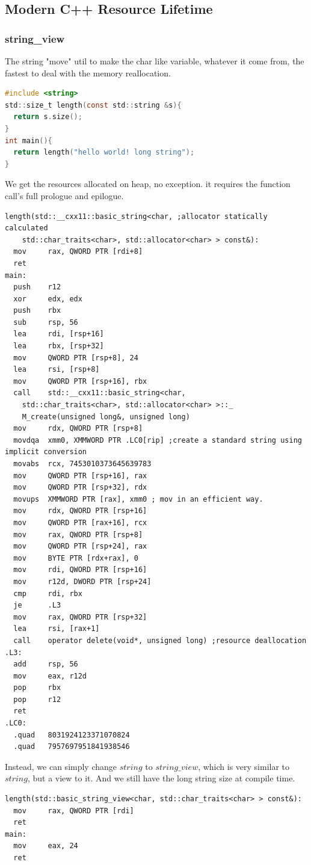 \documentclass[a4paper]{article}
\theoremstyle{definition}
\begin{document}
\subsection{Modern C++ Resource Lifetime}
\subsubsection{string\_view}
The string "move" util to make the char like variable, whatever it come from, the fastest to deal with the memory reallocation.

\begin{lstlisting}[language=C]
#include <string>
std::size_t length(const std::string &s){
  return s.size();
}
int main(){
  return length("hello world! long string");
}
\end{lstlisting}

We get the resources allocated on heap, no exception. it requires the function call's full prologue and epilogue.
\begin{lstlisting}[language={[Motorola68k]Assembler}]
  length(std::__cxx11::basic_string<char, ;allocator statically calculated
    std::char_traits<char>, std::allocator<char> > const&):
  mov     rax, QWORD PTR [rdi+8]
  ret
main:
  push    r12
  xor     edx, edx
  push    rbx
  sub     rsp, 56
  lea     rdi, [rsp+16]
  lea     rbx, [rsp+32]
  mov     QWORD PTR [rsp+8], 24
  lea     rsi, [rsp+8]
  mov     QWORD PTR [rsp+16], rbx
  call    std::__cxx11::basic_string<char, 
    std::char_traits<char>, std::allocator<char> >::_
    M_create(unsigned long&, unsigned long)
  mov     rdx, QWORD PTR [rsp+8]
  movdqa  xmm0, XMMWORD PTR .LC0[rip] ;create a standard string using implicit conversion
  movabs  rcx, 7453010373645639783
  mov     QWORD PTR [rsp+16], rax
  mov     QWORD PTR [rsp+32], rdx
  movups  XMMWORD PTR [rax], xmm0 ; mov in an efficient way.
  mov     rdx, QWORD PTR [rsp+16]
  mov     QWORD PTR [rax+16], rcx
  mov     rax, QWORD PTR [rsp+8]
  mov     QWORD PTR [rsp+24], rax
  mov     BYTE PTR [rdx+rax], 0
  mov     rdi, QWORD PTR [rsp+16]
  mov     r12d, DWORD PTR [rsp+24]
  cmp     rdi, rbx
  je      .L3
  mov     rax, QWORD PTR [rsp+32]
  lea     rsi, [rax+1]
  call    operator delete(void*, unsigned long) ;resource deallocation
.L3:
  add     rsp, 56
  mov     eax, r12d
  pop     rbx
  pop     r12
  ret
.LC0:
  .quad   8031924123371070824
  .quad   7957697951841938546
\end{lstlisting}
Instead, we can simply change $string$ to $string\_view$, which is very similar to $string$, but a view to it. And we still have the long string size at compile time.
\begin{lstlisting}[language={[Motorola68k]Assembler}]
length(std::basic_string_view<char, std::char_traits<char> > const&):
  mov     rax, QWORD PTR [rdi]
  ret
main:
  mov     eax, 24
  ret
\end{lstlisting}
\end{document}
